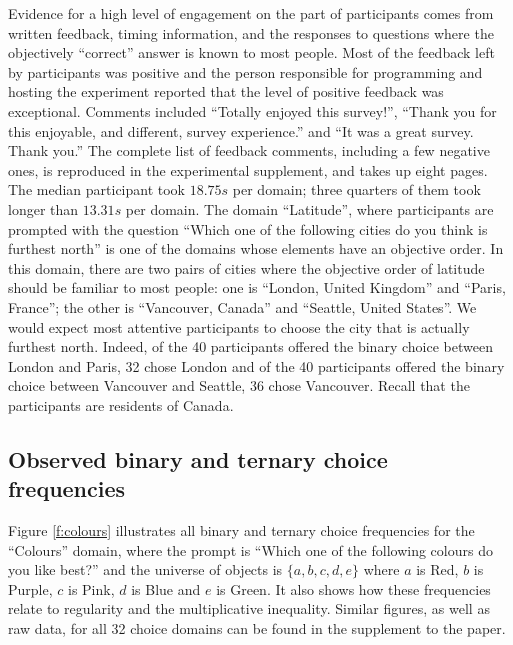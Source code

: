 \documentclass[11pt,letter]{article}
\begin{document}
Evidence for a high level of engagement on the part of participants comes from written feedback, timing information, and the responses to questions where the objectively ``correct'' answer is known to most people.
Most of the feedback left by participants was positive and the person responsible for programming and hosting the experiment reported that the level of positive feedback was exceptional.
Comments included ``Totally enjoyed this survey!'', ``Thank you for this enjoyable, and different, survey experience.'' and ``It was a great survey.  Thank you.''
The complete list of feedback comments, including a few negative ones, is reproduced in the experimental supplement, and takes up eight pages.
The median participant took $18.75s$ per domain; three quarters of them took longer than $13.31s$ per domain.
The domain ``Latitude'', where participants are prompted with the question ``Which one of the following cities do you think is furthest north'' is one of the domains whose elements have an objective order.
In this domain, there are two pairs of cities where the objective order of latitude should be familiar to most people: one is ``London, United Kingdom'' and ``Paris, France''; the other is ``Vancouver, Canada'' and ``Seattle, United States''.
We would expect most attentive participants to choose the city that is actually furthest north.
Indeed, of the 40 participants offered the binary choice between London and Paris, 32 chose London and of the 40 participants offered the binary choice between Vancouver and Seattle, 36 chose Vancouver.
Recall that the participants are residents of Canada.

\subsection{Observed binary and ternary choice frequencies}

Figure \ref{f:colours} illustrates all binary and ternary choice frequencies for the ``Colours'' domain, where the prompt is ``Which one of the following colours do you like best?'' and the universe of objects is $\{a,b,c,d,e\}$ where $a$ is Red, $b$ is Purple, $c$ is Pink, $d$ is Blue and $e$ is Green.
It also shows how these frequencies relate to regularity and the multiplicative inequality.
Similar figures, as well as raw data, for all 32 choice domains can be found in the supplement to the paper.
\end{document}
